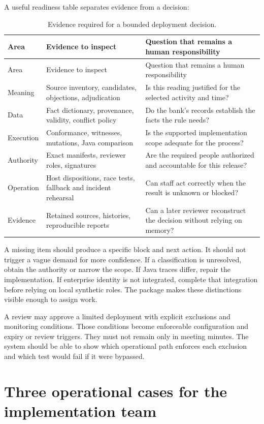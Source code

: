 A useful readiness table separates evidence from a decision:
\begin{longtable}{@{}P{31mm}P{60mm}P{57mm}@{}}
\caption{Evidence required for a bounded deployment decision.}\\
\toprule
Area & Evidence to inspect & Question that remains a human responsibility\\\midrule\endfirsthead
\toprule Area & Evidence to inspect & Question that remains a human responsibility\\\midrule\endhead
Meaning & Source inventory, candidates, objections, adjudication & Is this reading justified for the selected activity and time?\\
Data & Fact dictionary, provenance, validity, conflict policy & Do the bank's records establish the facts the rule needs?\\
Execution & Conformance, witnesses, mutations, Java comparison & Is the supported implementation scope adequate for the process?\\
Authority & Exact manifests, reviewer roles, signatures & Are the required people authorized and accountable for this release?\\
Operation & Host dispositions, race tests, fallback and incident rehearsal & Can staff act correctly when the result is unknown or blocked?\\
Evidence & Retained sources, histories, reproducible reports & Can a later reviewer reconstruct the decision without relying on memory?\\
\bottomrule
\end{longtable}

A missing item should produce a specific block and next action. It should not
trigger a vague demand for more confidence. If a classification is unresolved,
obtain the authority or narrow the scope. If Java traces differ, repair the
implementation. If enterprise identity is not integrated, complete that integration
before relying on local synthetic roles. The package makes these distinctions
visible enough to assign work.

A review may approve a limited deployment with explicit exclusions and monitoring
conditions. Those conditions become enforceable configuration and expiry or
review triggers. They must not remain only in meeting minutes. The system should
be able to show which operational path enforces each exclusion and which test
would fail if it were bypassed.

\section{Three operational cases for the implementation team}

